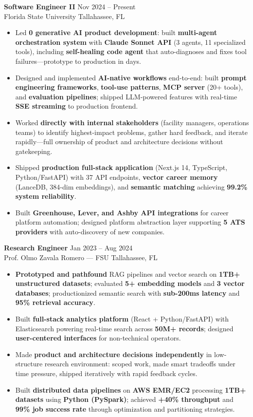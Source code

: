 \documentclass[letterpaper,10pt]{article}
\newcommand{\resumeItem}[1]{\item\small #1}
\newcommand{\resumeSubheading}[4]{
  \vspace{6pt}
  \noindent
  \textbf{#1} \hfill {\footnotesize #2} \\
  [-1pt]
  \noindent
  \small #3 \hfill {\small #4}
  \vspace{3pt}
}
\newcommand{\resumeItemsStart}{\vspace{-2pt}\begin{itemize}}
\newcommand{\resumeItemsEnd}{\end{itemize}\vspace{6pt}}
\begin{document}
\resumeSubheading
{Software Engineer II}{Nov 2024 -- Present}
{Florida State University}{Tallahassee, FL}
\resumeItemsStart
\resumeItem{Led \textbf{0 generative AI product development}: built \textbf{multi-agent orchestration system} with \textbf{Claude Sonnet API} (3 agents, 11 specialized tools), including \textbf{self-healing code agent} that auto-diagnoses and fixes tool failures---prototype to production in days.}
\resumeItem{Designed and implemented \textbf{AI-native workflows} end-to-end: built \textbf{prompt engineering frameworks}, \textbf{tool-use patterns}, \textbf{MCP server} (20+ tools), and \textbf{evaluation pipelines}; shipped LLM-powered features with real-time \textbf{SSE streaming} to production frontend.}
\resumeItem{Worked \textbf{directly with internal stakeholders} (facility managers, operations teams) to identify highest-impact problems, gather hard feedback, and iterate rapidly---full ownership of product and architecture decisions without gatekeeping.}
\resumeItem{Shipped \textbf{production full-stack application} (Next.js 14, TypeScript, Python/FastAPI) with 37 API endpoints, \textbf{vector career memory} (LanceDB, 384-dim embeddings), and \textbf{semantic matching} achieving \textbf{99.2\% system reliability}.}
\resumeItem{Built \textbf{Greenhouse, Lever, and Ashby API integrations} for career platform automation; designed platform abstraction layer supporting \textbf{5 ATS providers} with auto-discovery of new companies.}
\resumeItemsEnd
\vspace{-12pt}

\resumeSubheading
{Research Engineer}{Jan 2023 -- Aug 2024}
{Prof. Olmo Zavala Romero --- FSU}{Tallahassee, FL}
\resumeItemsStart
\resumeItem{\textbf{Prototyped and pathfound} RAG pipelines and vector search on \textbf{1TB+ unstructured datasets}; evaluated \textbf{5+ embedding models} and \textbf{3 vector databases}; productionized semantic search with \textbf{sub-200ms latency} and \textbf{95\% retrieval accuracy}.}
\resumeItem{Built \textbf{full-stack analytics platform} (React + Python/FastAPI) with Elasticsearch powering real-time search across \textbf{50M+ records}; designed \textbf{user-centered interfaces} for non-technical operators.}
\resumeItem{Made \textbf{product and architecture decisions independently} in low-structure research environment: scoped work, made smart tradeoffs under time pressure, shipped iteratively with rapid feedback cycles.}
\resumeItem{Built \textbf{distributed data pipelines} on \textbf{AWS EMR/EC2} processing \textbf{1TB+ datasets} using \textbf{Python (PySpark)}; achieved \textbf{+40\% throughput} and \textbf{99\% job success rate} through optimization and partitioning strategies.}
\resumeItemsEnd
\vspace{-12pt}
\end{document}
